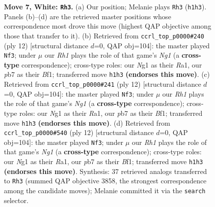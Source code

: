 \documentclass[11pt]{article}
\begin{document}
\begin{figure}[p]
\caption{\textbf{Move 7, White: \texttt{Rh3}.} (a) Our position; Melanie plays \texttt{Rh3} (\texttt{h1h3}). Panels (b)--(d) are the retrieved master positions whose correspondence most drove this move (highest QAP objective among those that transfer to it). (b) Retrieved from \texttt{ccrl\_top\_p0000\#240} (ply 12) [structural distance $d$=0, QAP obj=104]: the master played \texttt{Nf3}; under $\mu$ our \emph{Rh1} plays the role of that game's \emph{Ng1} (a \textbf{cross-type} correspondence); cross-type roles: our \emph{N}g1 as their \emph{R}a1, our \emph{p}b7 as their \emph{B}f1; transferred move \texttt{h1h3} \textbf{(endorses this move)}. (c) Retrieved from \texttt{ccrl\_top\_p0000\#241} (ply 12) [structural distance $d$=0, QAP obj=104]: the master played \texttt{Nf3}; under $\mu$ our \emph{Rh1} plays the role of that game's \emph{Ng1} (a \textbf{cross-type} correspondence); cross-type roles: our \emph{N}g1 as their \emph{R}a1, our \emph{p}b7 as their \emph{B}f1; transferred move \texttt{h1h3} \textbf{(endorses this move)}. (d) Retrieved from \texttt{ccrl\_top\_p0000\#540} (ply 12) [structural distance $d$=0, QAP obj=104]: the master played \texttt{Nf3}; under $\mu$ our \emph{Rh1} plays the role of that game's \emph{Ng1} (a \textbf{cross-type} correspondence); cross-type roles: our \emph{N}g1 as their \emph{R}a1, our \emph{p}b7 as their \emph{B}f1; transferred move \texttt{h1h3} \textbf{(endorses this move)}. Synthesis: 37 retrieved analogs transferred to \texttt{Rh3} (summed QAP objective 3858, the strongest correspondence among the candidate moves); Melanie committed it via the \texttt{search} selector.}
\label{fig:thought-m12}
\end{figure}

\clearpage
\end{document}
